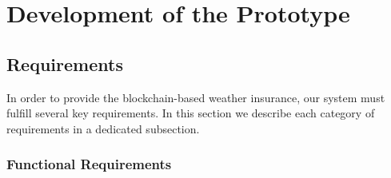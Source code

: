 \chapter{Development of the Prototype}\label{chapter:development_prototype}



\section{Requirements}\label{section:requirements}

In order to provide the blockchain-based weather insurance, our system must fulfill several key requirements. In this section we describe each category of requirements in a dedicated subsection.

\subsection{Functional Requirements}

